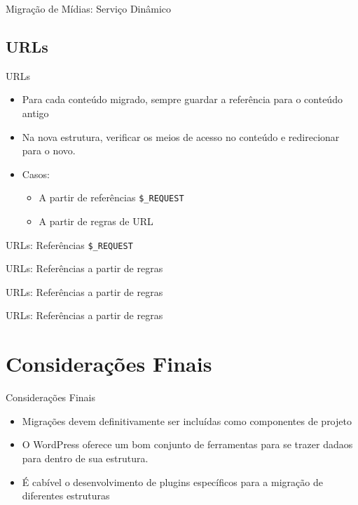 \documentclass[handout]{beamer}
\begin{document}
\begin{frame}{Migração de Mídias: Serviço Dinâmico}
  
\end{frame}


\subsection{URLs}

\begin{frame}{URLs}
  \begin{itemize}
    \item Para cada conteúdo migrado, sempre guardar a referência
          para o conteúdo antigo
    \pause \item Na nova estrutura, verificar os meios de acesso no conteúdo
           e redirecionar para o novo.
    \pause \item Casos:
    \begin{itemize}
      \item A partir de referências \texttt{\$\_REQUEST}
      \item A partir de regras de URL
    \end{itemize}
  \end{itemize}
\end{frame}

\begin{frame}{URLs: Referências \texttt{\$\_REQUEST}}
  
\end{frame}

\begin{frame}{URLs: Referências a partir de regras}
  
\end{frame}

\begin{frame}{URLs: Referências a partir de regras}
  
\end{frame}

\begin{frame}{URLs: Referências a partir de regras}
  
\end{frame}


\section{Considerações Finais}

\begin{frame}{Considerações Finais}
  \begin{itemize}
    \item Migrações devem definitivamente ser incluídas como
          componentes de projeto
    \item O WordPress oferece um bom conjunto de ferramentas
          para se trazer dadaos para dentro de sua estrutura.
    \item É cabível o desenvolvimento de plugins específicos
          para a migração de diferentes estruturas
  \end{itemize}
\end{frame}
\end{document}
